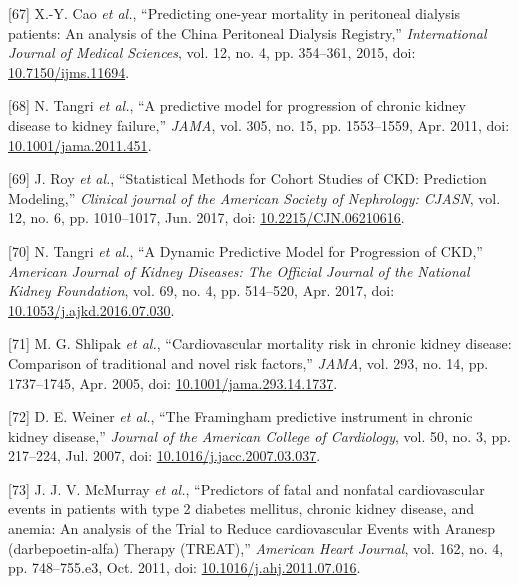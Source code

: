 \documentclass[12pt,PhD,twoside,openright]{muthesis}
\newenvironment{cslreferences}%
  {}%
  {\par}
\begin{document}
\begin{cslreferences}
\leavevmode\hypertarget{ref-cao_predicting_2015}{}%
{[}67{]} X.-Y. Cao \emph{et al.}, ``Predicting one-year mortality in peritoneal dialysis patients: An analysis of the China Peritoneal Dialysis Registry,'' \emph{International Journal of Medical Sciences}, vol. 12, no. 4, pp. 354--361, 2015, doi: \href{https://doi.org/10.7150/ijms.11694}{10.7150/ijms.11694}.

\leavevmode\hypertarget{ref-tangri_predictive_2011}{}%
{[}68{]} N. Tangri \emph{et al.}, ``A predictive model for progression of chronic kidney disease to kidney failure,'' \emph{JAMA}, vol. 305, no. 15, pp. 1553--1559, Apr. 2011, doi: \href{https://doi.org/10.1001/jama.2011.451}{10.1001/jama.2011.451}.

\leavevmode\hypertarget{ref-roy_statistical_2017}{}%
{[}69{]} J. Roy \emph{et al.}, ``Statistical Methods for Cohort Studies of CKD: Prediction Modeling,'' \emph{Clinical journal of the American Society of Nephrology: CJASN}, vol. 12, no. 6, pp. 1010--1017, Jun. 2017, doi: \href{https://doi.org/10.2215/CJN.06210616}{10.2215/CJN.06210616}.

\leavevmode\hypertarget{ref-tangri_dynamic_2017}{}%
{[}70{]} N. Tangri \emph{et al.}, ``A Dynamic Predictive Model for Progression of CKD,'' \emph{American Journal of Kidney Diseases: The Official Journal of the National Kidney Foundation}, vol. 69, no. 4, pp. 514--520, Apr. 2017, doi: \href{https://doi.org/10.1053/j.ajkd.2016.07.030}{10.1053/j.ajkd.2016.07.030}.

\leavevmode\hypertarget{ref-shlipak_cardiovascular_2005}{}%
{[}71{]} M. G. Shlipak \emph{et al.}, ``Cardiovascular mortality risk in chronic kidney disease: Comparison of traditional and novel risk factors,'' \emph{JAMA}, vol. 293, no. 14, pp. 1737--1745, Apr. 2005, doi: \href{https://doi.org/10.1001/jama.293.14.1737}{10.1001/jama.293.14.1737}.

\leavevmode\hypertarget{ref-weiner_framingham_2007}{}%
{[}72{]} D. E. Weiner \emph{et al.}, ``The Framingham predictive instrument in chronic kidney disease,'' \emph{Journal of the American College of Cardiology}, vol. 50, no. 3, pp. 217--224, Jul. 2007, doi: \href{https://doi.org/10.1016/j.jacc.2007.03.037}{10.1016/j.jacc.2007.03.037}.

\leavevmode\hypertarget{ref-mcmurray_predictors_2011}{}%
{[}73{]} J. J. V. McMurray \emph{et al.}, ``Predictors of fatal and nonfatal cardiovascular events in patients with type 2 diabetes mellitus, chronic kidney disease, and anemia: An analysis of the Trial to Reduce cardiovascular Events with Aranesp (darbepoetin-alfa) Therapy (TREAT),'' \emph{American Heart Journal}, vol. 162, no. 4, pp. 748--755.e3, Oct. 2011, doi: \href{https://doi.org/10.1016/j.ahj.2011.07.016}{10.1016/j.ahj.2011.07.016}.


\end{cslreferences}
\end{document}
